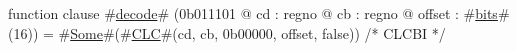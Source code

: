 function clause #\hyperref[zdecode]{decode}# (0b011101 @ cd : regno @ cb : regno @ offset : #\hyperref[zbits]{bits}#(16)) = #\hyperref[zSome]{Some}#(#\hyperref[zCLC]{CLC}#(cd, cb, 0b00000, offset, false))                                 /* CLCBI */
